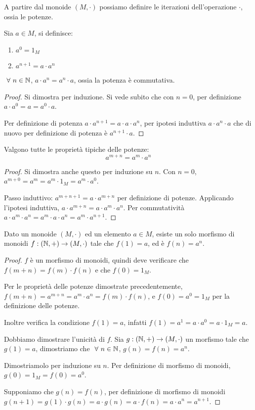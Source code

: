 \begin{defn}[Potenze]
A partire dal monoide $(M, \cdot)$ possiamo definire le iterazioni dell'operazione $\cdot$, ossia le potenze.

Sia $ a \in M$, si definisce:
\begin{enumerate}
    \item $a^0 = 1_M$
    \item $a^{n+1} = a \cdot a^{n}$
\end{enumerate}
\end{defn}
\begin{prop}
$\forall n \in \naturals$, $a \cdot a^n = a^n \cdot a$, ossia la potenza \`e commutativa.
\end{prop}
\begin{proof}
Si dimostra per induzione. Si vede subito che con $n = 0$, per definizione $a \cdot a^0 = a = a^0 \cdot a$.

Per definizione di potenza $a \cdot a^{n+1} = a \cdot a \cdot a^{n} $, per ipotesi induttiva $ a \cdot a^n \cdot a $ che di nuovo per definizione di potenza \`e $ a^{n+1} \cdot a$.
\end{proof}
\begin{prop}
Valgono tutte le propriet\`a tipiche delle potenze:
\[
a^{m + n} = a^m \cdot a^n
\]
\end{prop}
\begin{proof}
Si dimostra anche questo per induzione su $n$. Con $n = 0$, $a^{m+0} = a^m = a^m \cdot 1_M = a^m \cdot a^0$.

Passo induttivo: $a^{m + n + 1} = a \cdot a^{m + n}$ per definizione di potenze. Applicando l'ipotesi induttiva, $a \cdot a^{m + n} = a \cdot a^m \cdot a^n$. Per commutativit\`a $a \cdot a^m \cdot a^n = a^m \cdot a \cdot a^n = a^m \cdot a^{n+1}$.
\end{proof}

\begin{theorem}
Dato un monoide $(M, \cdot)$ ed un elemento $a \in M$, esiste un solo morfismo di monoidi $f : (\mathbb{N}, +) \to (M, \cdot)$ tale che $f(1) = a$, ed \`e $f(n) = a^n$.
\end{theorem}
\begin{proof}
$f$ \`e un morfismo di monoidi, quindi deve verificare che $f(m+n) = f(m) \cdot f(n)$ e che $f(0) = 1_M$. 

Per le propriet\`a delle potenze dimostrate precedentemente, $f(m+ n) = a^{m+n} = a^m \cdot a^n = f(m) \cdot f(n)$, e $f(0) = a^0 = 1_M$ per la definizione delle potenze. 

Inoltre verifica la condizione $f(1) = a$, infatti $f(1) = a^1 = a \cdot a^0 = a \cdot 1_M = a$.

Dobbiamo dimostrare l'unicit\`a di $f$. Sia $g : (\mathbb{N}, +) \to (M, \cdot )$ un morfismo tale che $g(1) = a$, dimostriamo che $\forall n \in \naturals $, $ g(n) = f(n) = a^n$.

Dimostriamolo per induzione su $n$. Per definizione di morfismo di monoidi, $g(0) = 1_M = f(0) = a^0$.

Supponiamo che $g(n) = f(n)$, per definizione di morfismo di monoidi $g(n+1) = g(1) \cdot g(n) = a \cdot g(n) = a \cdot f(n) = a \cdot a^n = a^{n+1}$.
\end{proof}


